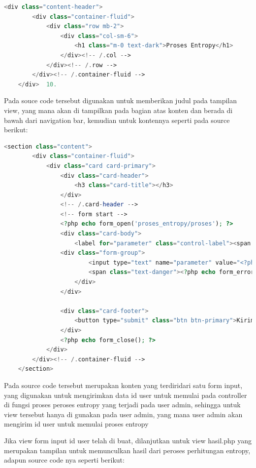 \begin{lstlisting}[language=PHP]
	<div class="content-header">  
	    <div class="container-fluid"> 
	        <div class="row mb-2">  
	            <div class="col-sm-6">  
	                <h1 class="m-0 text-dark">Proses Entropy</h1>  
	            </div><!-- /.col -->  
	        </div><!-- /.row -->  
	    </div><!-- /.container-fluid -->  
	</div>  10.	  
\end{lstlisting}
Pada souce code tersebut digunakan untuk memberikan judul pada tampilan view, yang mana akan di tampilkan pada bagian atas konten dan berada di bawah dari navigation bar, kemudian untuk kontennya seperti pada source berikut:
\begin{lstlisting}[language=PHP]
	<section class="content">  
	    <div class="container-fluid">  
	        <div class="card card-primary">  
	            <div class="card-header">  
	                <h3 class="card-title"></h3>  
	            </div>  
	            <!-- /.card-header -->  
	            <!-- form start -->  
	            <?php echo form_open('proses_entropy/proses'); ?>  
	            <div class="card-body">  
	                <label for="parameter" class="control-label"><span class="text-danger">*</span>Masukan ID User</label>  
                <div class="form-group">  
	                    <input type="text" name="parameter" value="<?php echo $this->input->post('parameter'); ?>" class="form-control" id="parameter" required />  
	                    <span class="text-danger"><?php echo form_error('parameter'); ?></span>  
	                </div>  
	            </div>  
	  
	            <div class="card-footer">  
	                <button type="submit" class="btn btn-primary">Kirim</button>  
	            </div>  
	            <?php echo form_close(); ?>  
	        </div>  
	    </div><!-- /.container-fluid -->  
	</section>  
\end{lstlisting}

Pada source code tersebut merupakan konten yang terdiridari satu form input, yang digunakan untuk mengirimkan data id user untuk memulai pada controller di fungsi proses peroses entropy yang terjadi pada user admin, sehingga untuk view tersebut hanya di gunakan pada user admin, yang mana user admin akan mengirim id user untuk memulai proses entropy\par
Jika view form input id user telah di buat, dilanjutkan untuk view hasil.php yang merupakan tampilan untuk memunculkan hasil dari peroses perhitungan entropy, adapun source code nya seperti berikut:\par

